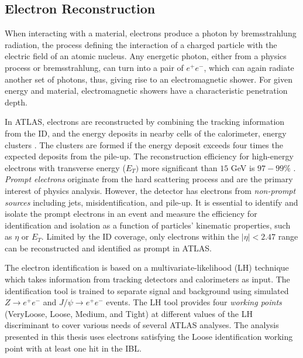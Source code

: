 \subsection{Electron Reconstruction}
\label{subsec:ParticleRecon_Elec}
When interacting with a material, electrons produce a photon by bremsstrahlung radiation, the process defining the interaction of a charged particle with the electric field of an atomic nucleus. Any energetic photon, either from a physics process or bremsstrahlung, can turn into a pair of $e^{+}e^{-}$, which can again radiate another set of photons, thus, giving rise to an electromagnetic shower. For given energy and material, electromagnetic showers have a characteristic penetration depth.

In ATLAS, electrons are reconstructed by combining the tracking information from the ID, and the energy deposits in nearby cells of the calorimeter,  energy clusters \cite{ElectronReco}. The clusters are formed if the energy deposit exceeds four times the expected deposits from the pile-up. The reconstruction efficiency for high-energy electrons with transverse energy ($E_{T})$ more significant than $15$ GeV is $97-99\%$ \cite{ElectronReco}. \textit{Prompt electrons} originate from the hard scattering process and are the primary interest of physics analysis. However, the detector has electrons from \textit{non-prompt sources} including jets, misidentification, and pile-up. It is essential to identify and isolate the prompt electrons in an event and measure the efficiency for identification and isolation as a function of particles' kinematic properties, such as $\eta$ or $E_{T}$. Limited by the ID coverage, only electrons within the $|\eta| <2.47$ range can be reconstructed and identified as prompt in ATLAS.

The electron identification is based on a multivariate-likelihood (LH) technique which takes information from tracking detectors and calorimeters as input. The identification tool is trained to separate signal and background using simulated $Z \rightarrow e^{+}e^{-}$ and $J / \psi \rightarrow e^{+}e^{-}$ events. The LH tool provides four \textit{working points} (VeryLoose, Loose, Medium, and Tight) at different values of the LH discriminant to cover various needs of several ATLAS analyses. The analysis presented in this thesis uses electrons satisfying the Loose identification working point with at least one hit in the IBL. 


